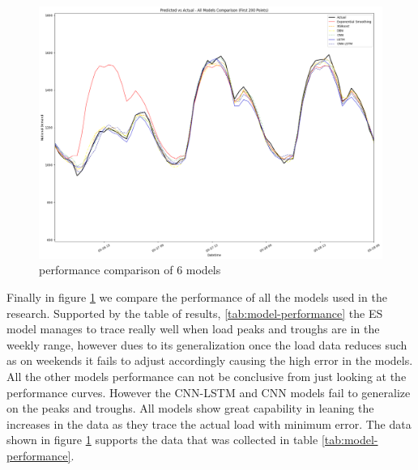   
 \begin{figure}[h]
 	\centering
 	\includegraphics[width=0.8\linewidth]{Chapters/images/results/all_model_comparison}
 	\caption{performance comparison of 6 models}
 	\label{fig:allmodelcomparison}
 \end{figure}
  Finally in figure \ref{fig:allmodelcomparison} we compare the performance of all the models used in the research. Supported by the table of results, \ref{tab:model-performance} the ES model manages to trace really well when load peaks and troughs are in the weekly range, however dues to its generalization once the load data reduces such as on weekends it fails to adjust accordingly causing the high error in the models. All the other models performance can not be conclusive from just looking at the performance curves. However the CNN-LSTM  and CNN models fail to generalize on the peaks and troughs. All models show  great capability in leaning the increases in the data as they trace the actual load with minimum error. The data shown in figure \ref{fig:allmodelcomparison} supports the data that was collected in table \ref{tab:model-performance}.
 